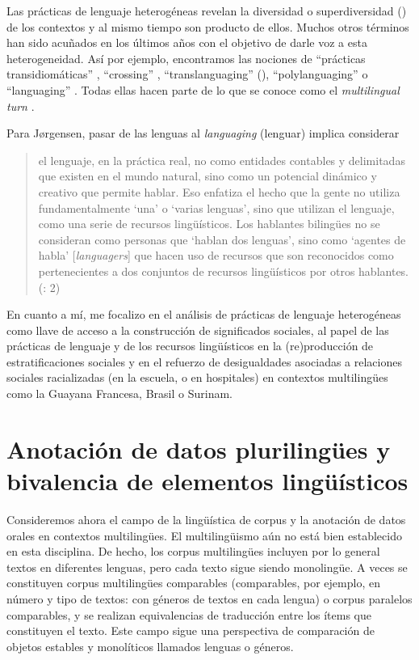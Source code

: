 \documentclass[output=paper]{langscibook}
\begin{document}
Las prácticas de lenguaje heterogéneas revelan la diversidad o superdiversidad (\citealt{Vertovec2007,BlommaertRampton2011}) de los contextos y al mismo tiempo son producto de ellos. Muchos otros términos han sido acuñados en los últimos años con el objetivo de darle voz a esta heterogeneidad. Así por ejemplo, encontramos las nociones de “prácticas transidiomáticas” \citep{Jacquemet2005}, “crossing” \citep{Rampton2005}, “translanguaging” (\citealt{García2009,CreeseBlackledge2010,GarcíaWei2014}), “polylanguaging” o “languaging” \citep{JørgensenEtAl2011}. Todas ellas hacen parte de lo que se conoce como el \textit{multilingual turn} \citep{May2014}.

Para Jørgensen, pasar de las lenguas al \textit{languaging} (lenguar) implica considerar

\begin{quote}
el lenguaje, en la práctica real, no como entidades contables y delimitadas que existen en el mundo natural, sino como un potencial dinámico y creativo que permite hablar. Eso enfatiza el hecho que la gente no utiliza fundamentalmente ‘una’ o ‘varias lenguas’, sino que utilizan el lenguaje, como una serie de recursos lingüísticos. Los hablantes bilingües no se consideran como personas que ‘hablan dos lenguas’, sino como ‘agentes de habla’ [\textit{languagers}] que hacen uso de recursos que son reconocidos como pertenecientes a dos conjuntos de recursos lingüísticos por otros hablantes. (\citealt{JørgensenJuffermans2011}: 2)
\end{quote}

En cuanto a mí, me focalizo en el análisis de prácticas de lenguaje heterogéneas como llave de acceso a la construcción de significados sociales, al papel de las prácticas de lenguaje y de los recursos lingüísticos en la (re)producción de estratificaciones sociales y en el refuerzo de desigualdades asociadas a relaciones sociales racializadas (en la escuela, o en hospitales) en contextos multilingües como la Guayana Francesa, Brasil o Surinam.

 \section{Anotación de datos plurilingües y bivalencia de elementos lingüísticos}

Consideremos ahora el campo de la lingüística de corpus y la anotación de datos orales en contextos multilingües. El multilingüismo aún no está bien establecido en esta disciplina. De hecho, los corpus multilingües incluyen por lo general textos en diferentes lenguas, pero cada texto sigue siendo monolingüe. A veces se constituyen corpus multilingües comparables (comparables, por ejemplo, en número y tipo de textos: con géneros de textos en cada lengua) o corpus paralelos comparables, y se realizan equivalencias de traducción entre los ítems que constituyen el texto. Este campo sigue una perspectiva de comparación de objetos estables y monolíticos llamados lenguas o géneros.
\end{document}
